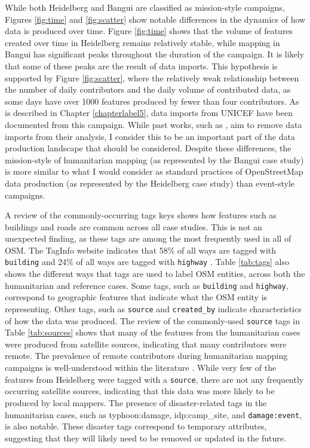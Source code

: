 While both Heidelberg and Bangui are classified as mission-style campaigns, Figures \ref{fig:time} and \ref{fig:scatter} show notable differences in the dynamics of how data is produced over time. Figure \ref{fig:time} shows that the volume of features created over time in Heidelberg remains relatively stable, while mapping in Bangui has significant peaks throughout the duration of the campaign. It is likely that some of these peaks are the result of data imports. This hypothesis is supported by Figure \ref{fig:scatter}, where the relatively weak relationship between the number of daily contributors and the daily volume of contributed data, as some days have over 1000 features produced by fewer than four contributors. As is described in Chapter \ref{chapterlabel5}, data imports from UNICEF have been documented from this campaign. While past works, such as \textcite{ahmouda_analyzing_2018}, aim to remove data imports from their analysis, I consider this to be an important part of the data production landscape that should be considered. Despite these differences, the mission-style of humanitarian mapping (as represented by the Bangui case study) is more similar to what I would consider as standard practices of OpenStreetMap data production (as represented by the Heidelberg case study) than event-style campaigns.

A review of the commonly-occurring tags keys shows how features such as buildings and roads are common across all case studies. This is not an unexpected finding, as these tags are among the most frequently used in all of OSM. The TagInfo website indicates that 58\% of all ways are tagged with \texttt{building} and 24\% of all ways are tagged with \texttt{highway} \parencite{noauthor_openstreetmap_2020}. Table \ref{tab:tags} also shows the different ways that tags are used to label OSM entities, across both the humanitarian and reference cases. Some tags, such as \texttt{building} and \texttt{highway}, correspond to geographic features that indicate what the OSM entity is representing. Other tags, such as \texttt{source} and \texttt{created_by} indicate characteristics of how the data was produced. The review of the commonly-used \texttt{source} tags in Table \ref{tab:sources} shows that many of the features from the humanitarian cases were produced from satellite sources, indicating that many contributors were remote. The prevalence of remote contributors during humanitarian mapping campaigns is well-understood within the literature \parencite{dittus_mass_2017, eckle_quality_2015}. While very few of the features from Heidelberg were tagged with a \texttt{source}, there are not any frequently occurring satellite sources, indicating that this data was more likely to be produced by local mappers. The presence of disaster-related tags in the humanitarian cases, such as \texttt{}{typhoon:damage, idp:camp_site}, and \texttt{damage:event}, is also notable. These disaster tags correspond to temporary attributes, suggesting that they will likely need to be removed or updated in the future. \\

